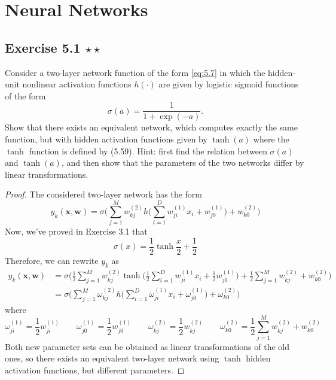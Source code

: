 \chapter{Neural Networks}

\section*{Exercise 5.1 $\star \star$}
Consider a two-layer network function of the form \eqref{eq:5.7}
in which the hidden-unit nonlinear activation functions $h(\cdot)$ 
are given by logistic sigmoid functions of the form
\begin{equation*}
    \sigma(a) = \frac{1}{1 + \exp(-a)}.
    \tag{5.191}\label{eq:5.191}
\end{equation*}
Show that there exists an equivalent network, which computes 
exactly the same function, but with hidden activation functions
given by $\tanh(a)$ where the $\tanh$ function is defined by
(5.59). Hint: first find the relation between $\sigma(a)$ 
and $\tanh(a)$, and then show that the parameters of the two
networks differ by linear transformations.

\vspace{1em}

\begin{proof}
    The considered two-layer network has the form
    \begin{equation*}
        y_k(\mathbf{x}, \mathbf{w}) 
        = \sigma\bigg(\sum_{j=1}^{M} w_{kj}^{(2)} 
        h\bigg(\sum_{i=1}^{D} w_{ji}^{(1)}x_i + w_{j0}^{(1)}\bigg) + w_{k0}^{(2)}\bigg)
        \tag{5.7}\label{eq:5.7}
    \end{equation*}
    Now, we've proved in Exercise 3.1 that 
    \[
        \sigma(x) = \frac{1}{2} \tanh \frac{x}{2} + \frac{1}{2}
    \] 
    Therefore, we can rewrite $y_k$ as
    \begin{align*}
        y_k(\mathbf{x}, \mathbf{w})
        &= \sigma\bigg(\frac{1}{2}\sum_{j=1}^{M} w_{kj}^{(2)} 
            \tanh\bigg(\frac{1}{2}\sum_{i=1}^{D} w_{ji}^{(1)}x_i + \frac{1}{2} w_{j0}^{(1)}\bigg)
            + \frac{1}{2} \sum_{j=1}^{M} w_{kj}^{(2)} + w_{k0}^{(2)}\bigg) \\
        &= \sigma\bigg(\sum_{j=1}^{M} \omega_{kj}^{(2)} 
        h\bigg(\sum_{i=1}^{D} \omega_{ji}^{(1)}x_i + \omega_{j0}^{(1)}\bigg) + \omega_{k0}^{(2)}\bigg)
    \end{align*}
    where 
    \[
        \omega_{ji}^{(1)} = \frac{1}{2} w_{ji}^{(1)}
        \hspace{2em}
        \omega_{j0}^{(1)} = \frac{1}{2} w_{j0}^{(1)}
        \hspace{2em}
        \omega_{kj}^{(2)} = \frac{1}{2} w_{kj}^{(2)}
        \hspace{2em}
        \omega_{k0}^{(2)} = \frac{1}{2}\sum_{j = 1}^M w_{kj}^{(2)} + w_{k0}^{(2)}
    \]
    Both new parameter sets can be obtained as linear transformations of the old ones,
    so there exists an equivalent two-layer network using $\tanh$ hidden activation functions,
    but different parameters.
\end{proof}

